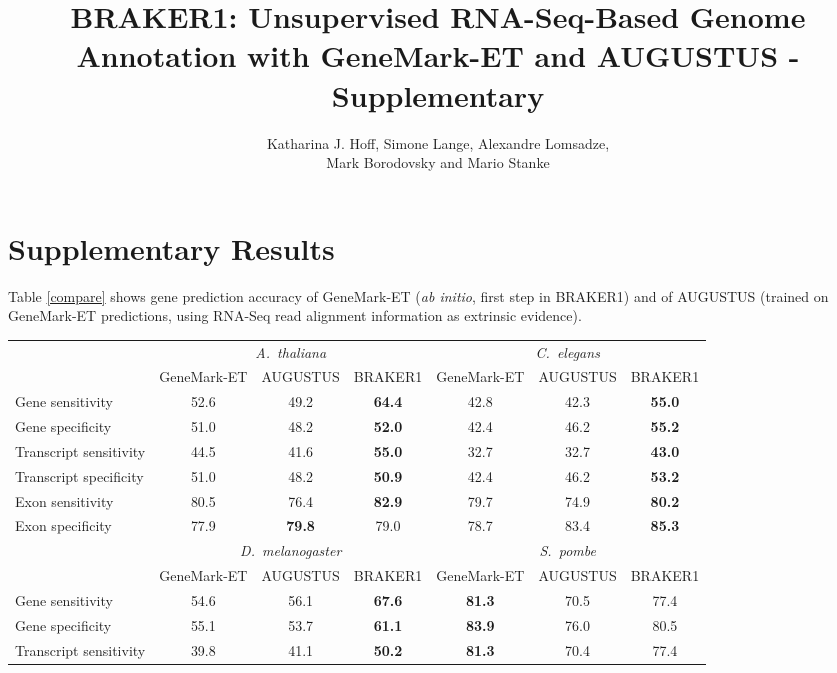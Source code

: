 \documentclass[a4paper,10pt]{report}
\title{BRAKER1: Unsupervised RNA-Seq-Based Genome Annotation with GeneMark-ET and AUGUSTUS - \textbf{Supplementary}}
\author{Katharina J. Hoff, Simone Lange, Alexandre Lomsadze,\\ Mark Borodovsky and Mario Stanke}
\begin{document}
\maketitle

\tableofcontents

\chapter{Supplementary Results}



Table \ref{compare} shows  gene prediction accuracy of GeneMark-ET (\textit{ab initio}, first step in BRAKER1) and of AUGUSTUS (trained on GeneMark-ET predictions, using RNA-Seq read alignment information as extrinsic evidence).

\begin{table}
\begin{center}
 \begin{scriptsize}
 \begin{tabular}{|l|ccc|ccc|}
 \hline
& \multicolumn{3}{|c|}{\textit{A.~thaliana}} & \multicolumn{3}{|c|}{\textit{C.~elegans}}\\
& GeneMark-ET & AUGUSTUS & BRAKER1 & GeneMark-ET & AUGUSTUS & BRAKER1\\
\hline
Gene sensitivity        & 52.6 & 49.2 & \textbf{64.4} & 42.8 & 42.3 & \textbf{55.0}\\
Gene specificity        & 51.0 & 48.2 & \textbf{52.0} & 42.4 & 46.2 & \textbf{55.2}\\
Transcript sensitivity  & 44.5 & 41.6 & \textbf{55.0} & 32.7 & 32.7 & \textbf{43.0}\\
Transcript specificity  & 51.0 & 48.2 & \textbf{50.9} & 42.4 & 46.2 & \textbf{53.2}\\
Exon sensitivity        & 80.5 & 76.4 & \textbf{82.9} & 79.7 & 74.9 & \textbf{80.2}\\
Exon specificity        & 77.9 & \textbf{79.8} & 79.0 & 78.7 & 83.4 & \textbf{85.3}\\
\hline
& \multicolumn{3}{|c|}{\textit{D.~melanogaster}} & \multicolumn{3}{|c|}{\textit{S.~pombe}}\\
& GeneMark-ET & AUGUSTUS & BRAKER1 & GeneMark-ET & AUGUSTUS & BRAKER1\\
\hline
Gene sensitivity       & 54.6 & 56.1 & \textbf{67.6} & \textbf{81.3} & 70.5 & 77.4\\
Gene specificity       & 55.1 & 53.7 & \textbf{61.1} & \textbf{83.9} & 76.0 & 80.5\\
Transcript sensitivity & 39.8 & 41.1 & \textbf{50.2} & \textbf{81.3} & 70.4 & 77.4\\

\end{tabular}
\end{scriptsize}
\end{center}
\end{table}
\end{document}
